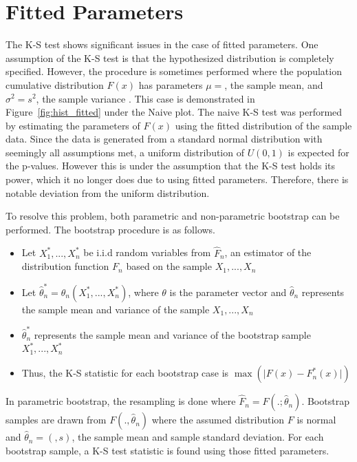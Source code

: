 \documentclass[12pt, letterpaper, titlepage]{article}
\makeatletter
\newcommand*{\Xbar}{}%
\DeclareRobustCommand*{\Xbar}{%
  \mathpalette\@Xbar{}%
}
\newcommand*{\@Xbar}[2]{%
  \sbox0{$#1\mathrm{X}\m@th$}%
  \sbox2{$#1X\m@th$}%
  \rlap{%
    \hbox to\wd2{%
      \hfill
      $\overline{%
        \vrule width 0pt height\ht0 %
        \kern\wd0 %
      }$%
    }%
  }%
  \copy2 %
}
\makeatother
\begin{document}
\hypertarget{sec:fitted}{%
\section{Fitted Parameters}\label{sec:fitted}}

The K-S test shows significant issues in the case of fitted parameters. One assumption 
of the K-S test is that the hypothesized distribution is completely specified. 
However, the procedure is sometimes performed where the population cumulative 
distribution $F(x)$ has parameters $\mu=\Xbar$, the sample mean, and $\sigma^2=s^2$, 
the sample variance \citep{Lilliefors}. This case is demonstrated in Figure~\ref{fig:hist_fitted} 
under the Naive plot. The naive K-S test was performed by estimating the parameters 
of $F(x)$ using the fitted distribution of the sample data. Since the data is generated 
from a standard normal distribution with seemingly all assumptions met, a uniform 
distribution of $U(0,1)$ is expected for the p-values. However this is under the 
assumption that the K-S test holds its power, which it no longer does due to using 
fitted parameters. Therefore, there is notable deviation from the uniform distribution. 

To resolve this problem, both parametric and non-parametric bootstrap can be performed. 
The bootstrap procedure is as follows. 

\begin{itemize}
  \item 
    Let $X_1^*,...,X_n^*$ be i.i.d random variables from $\hat{F}_n$, an estimator 
    of the distribution function $F_n$ based on the sample $X_1,...,X_n$
  \item 
    Let $\hat{\theta}_n^* = \theta_n(X_1^*,...,X_n^*)$, where $\theta$ is the 
    parameter vector and $\hat{\theta}_n$ represents the sample mean and variance 
    of the sample $X_1,...,X_n$
  \item 
    $\hat{\theta}_n^*$ represents the sample mean and variance of the bootstrap 
    sample $X_1^*,...,X_n^*$
  \item Thus, the K-S statistic for each bootstrap case is $\max(\lvert F(x)-F^*_n(x) \rvert)$
\end{itemize}

In parametric bootstrap, the resampling is done where $\hat{F}_n = F(.;\hat{\theta}_n)$. 
Bootstrap samples are drawn from ${F}(.,\hat{\theta}_n)$ where the assumed distribution 
$F$ is normal and $\hat{\theta}_n = (\Xbar, s)$, the sample mean and sample standard 
deviation. For each bootstrap sample, a K-S test statistic is found using those 
fitted parameters.
\end{document}
